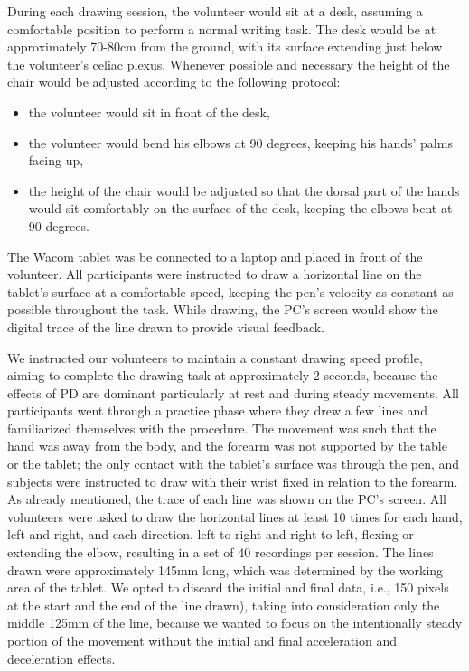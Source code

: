 During each drawing session, the volunteer would sit at a desk, assuming a comfortable position to perform a normal writing task. The desk would be at approximately 70-80cm from the ground, with its surface extending just below the volunteer's celiac plexus. Whenever possible and necessary the height of the chair would be adjusted according to the following protocol:
\begin{itemize}
\item the volunteer would sit in front of the desk,
\item the volunteer would bend his elbows at 90 degrees, keeping his hands' palms facing up,
\item the height of the chair would be adjusted so that the dorsal part of the hands would sit comfortably on the surface of the desk, keeping the elbows bent at 90 degrees. 
\end{itemize}
\noindent
The Wacom tablet was be connected to a laptop and placed in front of the volunteer. All participants were instructed to draw a horizontal line on the tablet's surface at a comfortable speed, keeping the pen's velocity as constant as possible throughout the task. While drawing, the PC's screen would show the digital trace of the line drawn to provide visual feedback. 


We instructed our volunteers to maintain a constant drawing speed profile, aiming to complete the drawing task at approximately 2 seconds, because the effects of \gls{PD} are dominant particularly at rest and during steady movements. All participants went through a practice phase where they drew a few lines and familiarized themselves with the procedure. The movement was such that the hand was away from the body, and the forearm was not supported by the table or the tablet; the only contact with the tablet's surface was through the pen, and subjects were instructed to draw with their wrist fixed in relation to the forearm. As already mentioned, the trace of each line was shown on the PC's screen. All volunteers were asked to draw the horizontal lines at least 10 times for each hand, left and right, and each direction, left-to-right and right-to-left, flexing or extending the elbow, resulting in a set of 40 recordings per session. The lines drawn were approximately 145mm long, which was determined by the working area of the tablet. We opted to discard the initial and final data, i.e., 150 pixels at the start and the end of the line drawn), taking into consideration only the middle 125mm of the line, because we wanted to focus on the intentionally steady portion of the movement without the initial and final acceleration and deceleration effects. 

